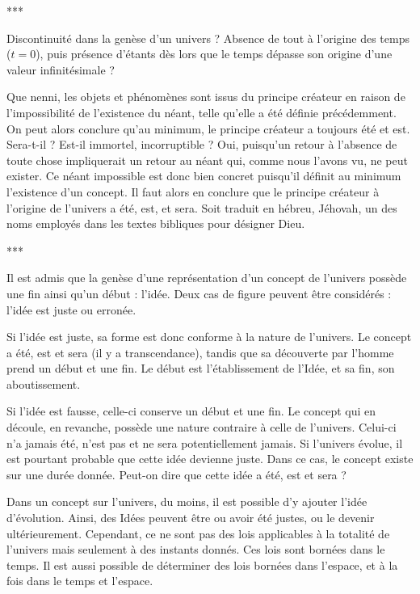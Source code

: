 \begin{center}
***
\end{center}

Discontinuité dans la genèse d’un univers ? Absence de tout à l’origine des temps ($t = 0$), puis présence d'étants dès lors que le temps dépasse son origine d'une valeur infinitésimale ?

Que nenni, les objets et phénomènes sont issus du principe créateur en raison de l’impossibilité de l’existence du néant, telle qu’elle a été définie précédemment. On peut alors conclure qu'au minimum, le principe créateur a toujours été et est. Sera-t-il ? Est-il immortel, incorruptible ? Oui, puisqu’un retour à l’absence de toute chose impliquerait un retour au néant qui, comme nous l’avons vu, ne peut exister. Ce néant impossible est donc bien concret puisqu’il définit au minimum l’existence d’un concept. Il faut alors en conclure que le principe créateur à l’origine de l’univers a été, est, et sera. Soit traduit en hébreu, Jéhovah, un des noms employés dans les textes bibliques pour désigner Dieu.


\begin{center}
***
\end{center}

Il est admis que la genèse d’une représentation d’un concept de l'univers possède une fin ainsi qu’un début : l’idée. Deux cas de figure peuvent être considérés : l’idée est juste ou erronée.

Si l’idée est juste, sa forme est donc conforme à la nature de l’univers. Le concept a été, est et sera (il y a transcendance), tandis que sa découverte par l'homme prend un début et une fin. Le début est l’établissement de l’Idée, et sa fin, son aboutissement.

Si l’idée est fausse, celle-ci conserve un début et une fin. Le concept qui en découle, en revanche, possède une nature contraire à celle de l’univers. Celui-ci n’a jamais été, n’est pas et ne sera potentiellement jamais. Si l’univers évolue, il est pourtant probable que cette idée devienne juste. Dans ce cas, le concept existe sur une durée donnée. Peut-on dire que cette idée a été, est et sera ?

Dans un concept sur l'univers, du moins, il est possible d’y ajouter l’idée d’évolution. Ainsi, des Idées peuvent être ou avoir été justes, ou le devenir ultérieurement. Cependant, ce ne sont pas des lois applicables à la totalité de l’univers mais seulement à des instants donnés. Ces lois sont bornées dans le temps. Il est aussi possible de déterminer des lois bornées dans l’espace, et à la fois dans le temps et l’espace.

